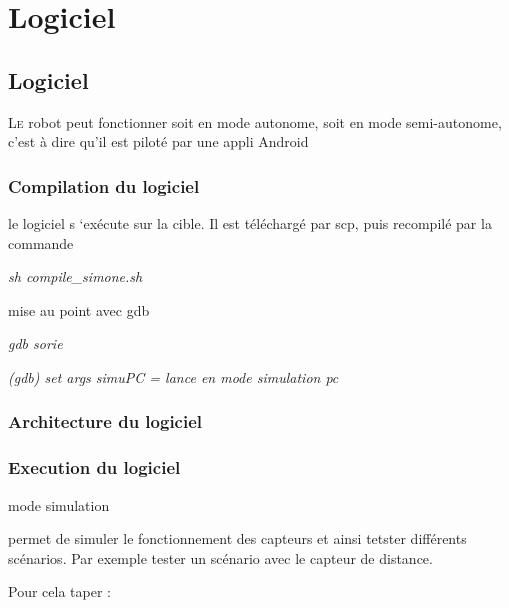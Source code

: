 \newpage

\chapter{Logiciel}
\section{Logiciel}
\lettrine[lines=1]{L}e robot peut fonctionner soit en mode autonome, soit en mode semi-autonome, c'est à dire qu'il est piloté par une appli Android


\subsection{Compilation du logiciel}



le logiciel s ‘exécute sur la cible. Il est téléchargé par scp, puis recompilé par la commande

\textit{sh compile\_simone.sh}



mise au point avec gdb

\textit{gdb sorie}

\textit{(gdb) set args simuPC = lance en mode simulation pc}



\subsection{Architecture  du logiciel}


\subsection{Execution du logiciel}





mode simulation





permet de simuler le fonctionnement des capteurs et ainsi tetster différents scénarios. Par exemple tester un scénario avec le capteur de distance.

Pour cela taper :




 